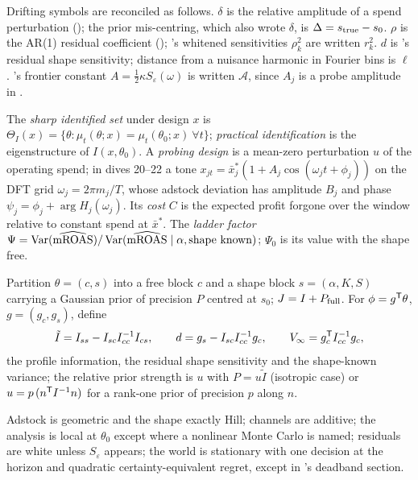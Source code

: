 Drifting symbols are reconciled as follows. $\delta$ is the relative amplitude of a spend perturbation (); the prior mis-centring, which  also wrote $\delta$, is $\Delta = s_{\rm true} - s_0$. $\rho$ is the AR(1) residual coefficient (); 's whitened sensitivities $\rho_k^2$ are written $r_k^2$. $d$ is 's residual shape sensitivity; distance from a nuisance harmonic in Fourier bins is $\ell$. 's frontier constant $A = \tfrac12\kappa S_\varepsilon(\omega)$ is written $\mathcal A$, since $A_j$ is a probe amplitude in .

\begin{definition}
\label{ident:def:main}
The \emph{sharp identified set} under design $x$ is $\Theta_I(x) = \{\theta : \mu_t(\theta; x) = \mu_t(\theta_0; x)\ \forall t\}$; \emph{practical identification} is the eigenstructure of $I(x, \theta_0)$. A \emph{probing design} is a mean-zero perturbation $u$ of the operating spend; in dives 20--22 a tone $x_{jt} = \bar x_j^*(1 + A_j\cos(\omega_j t + \phi_j))$ on the DFT grid $\omega_j = 2\pi m_j/T$, whose adstock deviation has amplitude $B_j$ and phase $\psi_j = \phi_j + \arg H_j(\omega_j)$. Its \emph{cost} $C$ is the expected profit forgone over the window relative to constant spend at $\bar x^*$. The \emph{ladder factor} $\Psi = \operatorname{Var}(\widehat{\mathrm{mROAS}})/\operatorname{Var}(\widehat{\mathrm{mROAS}} \mid \alpha, \text{shape known})$; $\Psi_0$ is its value with the shape free.
\end{definition}

\begin{definition}
\label{ident:def:prior}
Partition $\theta = (c, s)$ into a free block $c$ and a shape block $s = (\alpha, K, S)$ carrying a Gaussian prior of precision $P$ centred at $s_0$; $J = I + P_{\rm full}$. For $\phi = g^{\mathsf{T}}\theta$, $g = (g_c, g_s)$, define
\begin{equation}
\tilde I = I_{ss} - I_{sc}I_{cc}^{-1}I_{cs}, \qquad d = g_s - I_{sc}I_{cc}^{-1}g_c, \qquad V_\infty = g_c^{\mathsf{T}} I_{cc}^{-1}g_c,
\label{ident:eq:ledgerobjects}
\end{equation}
the profile information, the residual shape sensitivity and the shape-known variance; the relative prior strength is $u$ with $P = u\tilde I$ (isotropic case) or $u = p\,(n^{\mathsf{T}} I^{-1}n)$ for a rank-one prior of precision $p$ along $n$.
\end{definition}

\begin{assumption}
\label{ident:ass:model}
Adstock is geometric and the shape exactly Hill; channels are additive; the analysis is local at $\theta_0$ except where a nonlinear Monte Carlo is named; residuals are white unless $S_\varepsilon$ appears; the world is stationary with one decision at the horizon and quadratic certainty-equivalent regret, except in 's deadband section.
\end{assumption}

